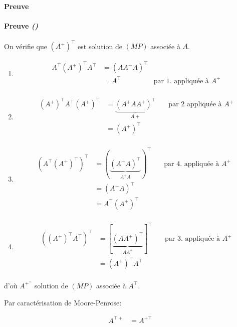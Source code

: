 \documentclass{article}
\newenvironment{proof}[1][\unskip]{
	\def\temp{#1}\ifx\temp\empty
		\paragraph{Preuve}
	\else
		\paragraph{Preuve \emph{(#1)}}
	\fi

}{}
\begin{document}
\begin{proof}
    On vérifie que $(A^+)^\top$ est solution de $(MP)$ associée à $A$.

    \begin{enumerate}
        \item \begin{align*}
            A^\top (A^+)^\top A^\top &= (A A^+ A)^\top \\
            &= A^\top \quad&\text{par 1. appliquée à $A^+$} \\
        \end{align*}

        \item \begin{align*}
                (A^+)^\top A^\top (A^+)^\top &= \underbrace{(A^+ A A^+)^\top}_{A+} \quad&\text{par 2 appliquée à $A^+$} \\
                &= (A^+)^\top \\
        \end{align*}

        \item \begin{align*}
                (A^\top (A^+)^\top)^\top &= ( \underbrace{(A^+ A)^\top}_{A^+ A})^\top \quad&\text{par 4. appliquée à $A^+$ } \\
                &= (A^+A)^\top \\
                &= A^\top (A^+)^\top \\
        \end{align*}

        \item \begin{align*}
                ((A^+)^\top A^\top)^\top &= [\underbrace{(A A^+)^\top}_{A A^+}]^\top \quad&\text{par 3. appliquée à $A^+$} \\
                &= (A^+)^\top A^\top \\
        \end{align*}

    \end{enumerate}
        d'où  $A^+^\top $ solution de  $(MP)$ associée à $A^\top$.

        Par caractérisation de Moore-Penrose:

         \begin{align*}
             A^{\top +} &= A^{+ \top} \\
        \end{align*}
\end{proof}
\end{document}
